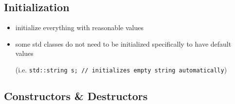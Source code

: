 \subsection{Initialization}

\begin{itemize}
	\item initialize everything with reasonable values
	\item some std classes do not need to be initialized specifically to have default values 
	
	(i.e. \texttt{std::string s; // initializes empty string automatically})
\end{itemize}

\subsection{Constructors \& Destructors}

